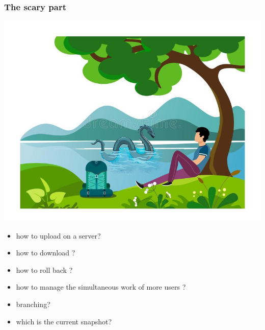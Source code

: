 \documentclass[aspectratio=169]{beamer}
\begin{document}
\begin{frame}
\frametitle<presentation>{The scary part}
  
\noindent\begin{minipage}{0.6\textwidth}%
\includegraphics[width=\linewidth]{pictures/resting-under-tree+nessie.png}
\end{minipage}%
\hfill%
\begin{minipage}{0.4\textwidth}\raggedleft
\begin{itemize}
	\item how to upload on a server?
	\item how to download ?
    \item how to roll back ?
    \item how to manage the simultaneous work of more users ?
	\item branching?
	\item which is the current snapshot?
	\end{itemize}
\end{minipage}
  
\end{frame}
\end{document}
